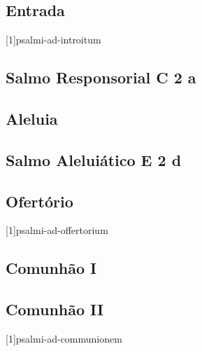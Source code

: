 
\subsection{Entrada}\label{subsection:tempus-nativitatis/sanctae-dei-genetricis-mariae/psalmi-ad-introitum}
[1]{psalmi-ad-introitum}

\AllowPageFlush

\subsection[Salmo Responsorial]{Salmo Responsorial \textmd{C 2 a}}\label{subsection:tempus-nativitatis/sanctae-dei-genetricis-mariae/psalmus-responsorius}

\AllowPageFlush

\subsection{Aleluia}\label{subsection:tempus-nativitatis/sanctae-dei-genetricis-mariae/alleluia}

\AllowPageFlush

\subsection[Salmo Aleluiático]{Salmo Aleluiático \textmd{E 2 d}}\label{subsection:tempus-nativitatis/sanctae-dei-genetricis-mariae/psalmus-alleluiaticus}

\AllowPageFlush

\subsection{Ofertório}\label{subsection:tempus-nativitatis/sanctae-dei-genetricis-mariae/psalmi-ad-offertorium}
[1]{psalmi-ad-offertorium}

\AllowPageFlush

\subsection{Comunhão I}\label{subsection:tempus-nativitatis/sanctae-dei-genetricis-mariae/communio-1}

\AllowPageFlush

\subsection{Comunhão II}\label{subsection:tempus-nativitatis/sanctae-dei-genetricis-mariae/communio-2}
[1]{psalmi-ad-communionem}
